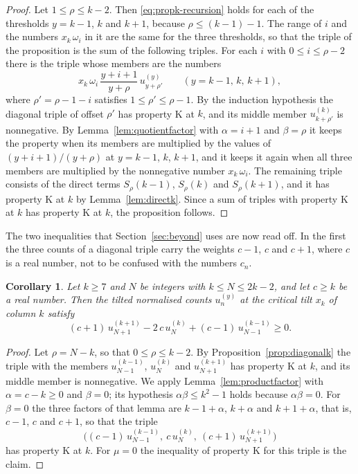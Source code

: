 \documentclass{amsart}
\newtheorem{corollary}[theorem]{Corollary}
\theoremstyle{definition}
\theoremstyle{remark}
\numberwithin{equation}{section}
\begin{document}
\begin{proof}
Let $1\le\rho\le k-2$. Then \eqref{eq:propk-recursion} holds for each of
the thresholds $y=k-1$, $k$ and $k+1$, because $\rho\le(k-1)-1$. The range
of $i$ and the numbers $x_k\,\omega_i$ in it are the same for the three
thresholds, so that the triple of the proposition is the sum of the
following triples. For each $i$ with $0\le i\le\rho-2$ there is the triple
whose members are the numbers
\[
x_k\,\omega_i\,\frac{y+i+1}{y+\rho}\,u^{(y)}_{y+\rho'}
\qquad(y=k-1,\,k,\,k+1),
\]
where $\rho'=\rho-1-i$ satisfies $1\le\rho'\le\rho-1$. By the induction
hypothesis the diagonal triple of offset $\rho'$ has property K at $k$, and
its middle member $u^{(k)}_{k+\rho'}$ is nonnegative. By
Lemma~\ref{lem:quotientfactor} with $\alpha=i+1$ and $\beta=\rho$ it keeps
the property when its members are multiplied by the values of
$(y+i+1)/(y+\rho)$ at $y=k-1$, $k$, $k+1$, and it keeps it again when all
three members are multiplied by the nonnegative number $x_k\,\omega_i$.
The remaining triple consists of the direct terms $S_\rho(k-1)$,
$S_\rho(k)$ and $S_\rho(k+1)$, and it has property K at $k$ by
Lemma~\ref{lem:directk}. Since a sum of triples with property K at $k$ has
property K at $k$, the proposition follows.
\end{proof}

The two inequalities that Section~\ref{sec:beyond} uses are now read off.
In the first the three counts of a diagonal triple carry the weights $c-1$,
$c$ and $c+1$, where $c$ is a real number, not to be confused with the
numbers $c_n$.

\begin{corollary}\label{cor:weightedlayer}
Let $k\ge7$ and $N$ be integers with $k\le N\le2k-2$, and let $c\ge k$ be a
real number. Then the tilted normalised counts $u^{(y)}_n$ at the critical
tilt $x_k$ of column $k$ satisfy
\[
(c+1)\,u^{(k+1)}_{N+1}-2\,c\,u^{(k)}_N+(c-1)\,u^{(k-1)}_{N-1}\ge0 .
\]
\end{corollary}

\begin{proof}
Let $\rho=N-k$, so that $0\le\rho\le k-2$. By
Proposition~\ref{prop:diagonalk} the triple with the members
$u^{(k-1)}_{N-1}$, $u^{(k)}_N$ and $u^{(k+1)}_{N+1}$ has property K at
$k$, and its middle member is nonnegative. We apply
Lemma~\ref{lem:productfactor} with $\alpha=c-k\ge0$ and $\beta=0$; its
hypothesis $\alpha\beta\le k^2-1$ holds because $\alpha\beta=0$. For
$\beta=0$ the three factors of that lemma are $k-1+\alpha$, $k+\alpha$ and
$k+1+\alpha$, that is, $c-1$, $c$ and $c+1$, so that the triple
\[
\bigl((c-1)\,u^{(k-1)}_{N-1},\ c\,u^{(k)}_N,\ (c+1)\,u^{(k+1)}_{N+1}\bigr)
\]
has property K at $k$. For $\mu=0$ the inequality of property K for this
triple is the claim.
\end{proof}
\end{document}
